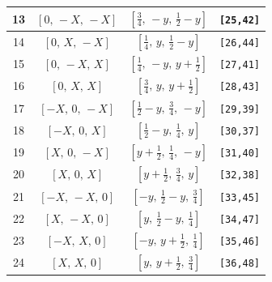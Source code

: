\documentclass[fleqn,8pt]{jsarticle}
\begin{document}
\begin{longtable}{cccc}
13 & $\left[ 0,\, - X,\, - X \right]$ & $\left[ \frac{3}{4},\, - y,\, \frac{1}{2} - y \right]$ & {\tt [25,42]} \\ \hline
14 & $\left[ 0,\, X,\, - X \right]$ & $\left[ \frac{1}{4},\, y,\, \frac{1}{2} - y \right]$ & {\tt [26,44]} \\ \hline
15 & $\left[ 0,\, - X,\, X \right]$ & $\left[ \frac{1}{4},\, - y,\, y + \frac{1}{2} \right]$ & {\tt [27,41]} \\ \hline
16 & $\left[ 0,\, X,\, X \right]$ & $\left[ \frac{3}{4},\, y,\, y + \frac{1}{2} \right]$ & {\tt [28,43]} \\ \hline
17 & $\left[ - X,\, 0,\, - X \right]$ & $\left[ \frac{1}{2} - y,\, \frac{3}{4},\, - y \right]$ & {\tt [29,39]} \\ \hline
18 & $\left[ - X,\, 0,\, X \right]$ & $\left[ \frac{1}{2} - y,\, \frac{1}{4},\, y \right]$ & {\tt [30,37]} \\ \hline
19 & $\left[ X,\, 0,\, - X \right]$ & $\left[ y + \frac{1}{2},\, \frac{1}{4},\, - y \right]$ & {\tt [31,40]} \\ \hline
20 & $\left[ X,\, 0,\, X \right]$ & $\left[ y + \frac{1}{2},\, \frac{3}{4},\, y \right]$ & {\tt [32,38]} \\ \hline
21 & $\left[ - X,\, - X,\, 0 \right]$ & $\left[ - y,\, \frac{1}{2} - y,\, \frac{3}{4} \right]$ & {\tt [33,45]} \\ \hline
22 & $\left[ X,\, - X,\, 0 \right]$ & $\left[ y,\, \frac{1}{2} - y,\, \frac{1}{4} \right]$ & {\tt [34,47]} \\ \hline
23 & $\left[ - X,\, X,\, 0 \right]$ & $\left[ - y,\, y + \frac{1}{2},\, \frac{1}{4} \right]$ & {\tt [35,46]} \\ \hline
24 & $\left[ X,\, X,\, 0 \right]$ & $\left[ y,\, y + \frac{1}{2},\, \frac{3}{4} \right]$ & {\tt [36,48]} \\
\end{longtable}
\renewcommand{\arraystretch}{1.2}
\end{document}
